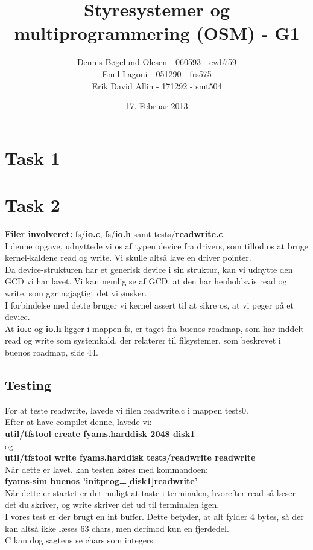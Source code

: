 \documentclass[a4paper,12pt]{article}
\title{Styresystemer og multiprogrammering (OSM) - G1}
\author{Dennis Bøgelund Olesen - 060593 - cwb759 \\ Emil Lagoni - 051290 - frs575 \\ Erik David Allin - 171292 - smt504}
\date{17. Februar 2013}
\begin{document}
\maketitle %
\thispagestyle{empty}
\setcounter{page}{0}
\newpage




\section*{Task 1}

\section*{Task 2}
\textbf{Filer involveret:} fs/\textbf{io.c}, fs/\textbf{io.h} samt tests/\textbf{readwrite.c}.
\\[5px]
I denne opgave, udnyttede vi os af typen device fra drivers, som tillod os at bruge kernel-kaldene read og write. Vi skulle altså lave en driver pointer. 
\\
Da device-strukturen har et generisk device i sin struktur, kan vi udnytte den GCD vi har lavet. Vi kan nemlig se af GCD, at den har henholdsvis read og write, som gør nøjagtigt det vi ønsker. 
\\
I forbindelse med dette bruger vi kernel assert til at sikre os, at vi peger på et device.
\\
At \textbf{io.c} og \textbf{io.h} ligger i mappen fs, er taget fra buenos roadmap, som har inddelt read og write som systemkald, der relaterer til filsystemer. som beskrevet i buenos roadmap, side 44. 
\\
\subsection{Testing}
For at teste readwrite, lavede vi filen readwrite.c i mappen tests0.
\\
Efter at have compilet denne, lavede vi:
\\
\textbf{util/tfstool create fyams.harddisk 2048 disk1}
\\
og
\\
\textbf{util/tfstool write fyams.harddisk tests/readwrite readwrite}
\\[5px]
Når dette er lavet. kan testen køres med kommandoen: 
\\
\textbf{fyams-sim buenos 'initprog=[disk1]readwrite'}
\\
Når dette er startet er det muligt at taste i terminalen, hvorefter read så læser det du skriver, og write skriver det ud til terminalen igen. 
\\
I vores test er der brugt en int buffer. Dette betyder, at alt fylder 4 bytes, så der kan altså ikke læses 63 chars, men derimod kun en fjerdedel. 
\\
C kan dog sagtens se chars som integers.
\end{document}
